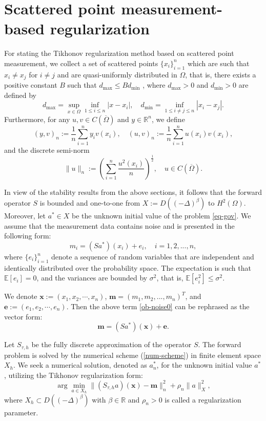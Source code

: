 \documentclass[11pt]{article}
\numberwithin{equation}{section}
\begin{document}
\section{Scattered point measurement-based regularization}\label{sec-regularization}
For stating the Tikhonov regularization method based on scattered point measurement, we collect a set of  scattered points $ \{ x_i \}_{i = 1}^n$ which are such that $ x_i \neq x_j $ for $ i \neq j $ and are quasi-uniformly distributed in $ \Omega $, that is, there exists a positive constant $ B $ such that $ d_{\max} \le B d_{\min} $ , where $ d_{\max}>0$ and $ d_{\min}>0$ are defined by
$$ 
d_{\max} = \sup_{x \in \Omega} \inf_{1 \leq i \leq n} | x - x_i |,\quad
d_{\min} = \inf_{1 \leq i \neq j \leq n} | x_i - x_j | .
$$
Furthermore, for any $u,v\in C(\overline\Omega)$ and $y\in\mathbb R^n$, we define
$$
(y,v)_n := \frac1n \sum_{i=1}^n y_i v(x_i),\quad (u,v)_n:=\frac1n \sum_{i=1}^n u(x_i)v(x_i),
$$
and the discrete semi-norm 
$$
\|u\|_n := \left(\sum_{i=1}^n \frac{u^2(x_i)}{n} \right)^{\frac12},\quad u\in C(\overline \Omega).
$$

In view of the stability results from the above sections, it follows that the forward operator $S$ is bounded and one-to-one from $X:=D((-\Delta)^\beta)$ to $H^2(\Omega)$. Moreover, let $a^*\in X $ be the unknown initial value of the problem \eqref{eq-gov}. We assume that the measurement data contains noise and is presented in the following form:
\begin{equation}\label{ob-noise0}
m_i = (Sa^*)(x_i) + e_i, \quad i = 1,2,...,n,
\end{equation}
where $\{e_i\}_{i=1}^n$ denote a sequence of random variables that are independent and identically distributed over the probability space. The expectation is such that $\mathbb{E}[e_i] = 0$, and the variances are bounded by $\sigma^2$, that is, $\mathbb{E}[e_i^2] \leq \sigma^2$. 

We denote $\mathbf{x}:=(x_1,x_2,\cdots,x_n)$, $\mathbf{m} = (m_1, m_2, ..., m_n)^T$, and $\mathbf{e}:=(e_1,e_2,\cdots,e_n)$. Then the above term \eqref{ob-noise0} can be rephrased as the vector form:
\begin{equation*}%
\mathbf{m} = (Sa^*)(\mathbf{x}) + \mathbf{e}.
\end{equation*}

Let $S_{\tau,h}$ be the fully discrete approximation of the operator $S$. The forward problem is solved by the numerical scheme (\ref{num-scheme}) in finite element space $X_h$. We seek a numerical solution, denoted as $ a_n^*$, for the unknown initial value $a^*$, utilizing the Tikhonov regularization form:
\begin{equation}\label{Tik-vec}
\arg\min_{a \in X_h} \| (S_{\tau,h}a)(\mathbf{x}) - \mathbf{m}\|_n^2 + \rho_n \| a \|^2_{X},
\end{equation}
where $X_h\subset D((-\Delta)^\beta)$ with $\beta\in \mathbb R$ and $ \rho_n > 0 $ is called a regularization parameter.
\end{document}
